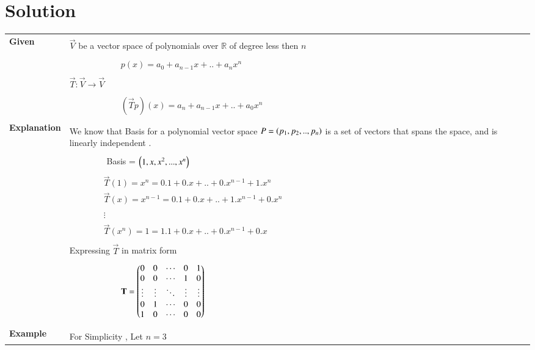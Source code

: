 \documentclass[journal,12pt]{IEEEtran}
\begin{document}
\section{\textbf{Solution}}
\renewcommand{\thetable}{2}
\begin{longtable}{|p{5cm}|p{13cm}|}
\hline
\endhead
    \multirow{3}{*}{\textbf{Given}} 
     &\\
     & $\vec{V}$ be a vector space of polynomials over $\mathbb{R}$ of degree less then $n$ \\
     &\\
     &$\qquad\qquad\qquad p(x)=a_0+a_{n-1}x+..+a_nx^{n}$\\
     &\\
     & $\vec{T}: \vec{V} \rightarrow \vec{V}$\\
     &\\
     & $\qquad\qquad\qquad(\vec{T}p)(x)=a_n+a_{n-1}x+..+a_0x^{n}$\\
     &\\
     \hline
     \multirow{3}{*}{\textbf{Explanation}}&\\
     & We know that Basis for a polynomial vector space $P=\left(p_1,p_2,..,p_n\right)$ is a set of vectors that spans the space, and is linearly independent .\\
     &\\
     &$\qquad\qquad$  Basis = $\left(1,x,x^2,...,x^{n}\right)$\\
     &\\
     & $\qquad\qquad\vec{T}(1) = x^{n} = 0.1+0.x+..+0.x^{n-1}+1.x^n$\\
     & $\qquad\qquad\vec{T}(x) = x^{n-1} = 0.1+0.x+..+1.x^{n-1}+0.x^{n}$\\
     & $\qquad\qquad\vdots$\\
     & $\qquad\qquad\vec{T}(x^{n}) = 1 = 1.1+0.x+..+0.x^{n-1}+0.x $\\
     &\\
     & Expressing $\vec{T}$ in matrix form\\
     &\\
     & $\qquad\qquad\qquad\mathbf{T}=\begin{pmatrix}0&0&\cdots&0&1\\0&0&\cdots&1&0\\\vdots&\vdots&\ddots&\vdots&\vdots\\0&1&\cdots&0&0\\1&0&\cdots&0&0\end{pmatrix}$\\ 
     &\\
    \hline
    \multirow{3}{*}{\textbf{Example} }
	& \\
	& For Simplicity , Let $n=3$\\

\end{longtable}
\end{document}
